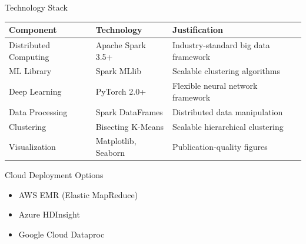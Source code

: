 \documentclass[10pt, aspectratio=169]{beamer}
\begin{document}
\begin{frame}{Technology Stack}
    \begin{table}
        \centering
        \footnotesize
        \begin{tabular}{@{}lll@{}}
            \toprule
            \textbf{Component} & \textbf{Technology} & \textbf{Justification} \\
            \midrule
            Distributed Computing & Apache Spark 3.5+ & Industry-standard big data framework \\
            ML Library & Spark MLlib & Scalable clustering algorithms \\
            Deep Learning & PyTorch 2.0+ & Flexible neural network framework \\
            Data Processing & Spark DataFrames & Distributed data manipulation \\
            Clustering & Bisecting K-Means & Scalable hierarchical clustering \\
            Visualization & Matplotlib, Seaborn & Publication-quality figures \\
            \bottomrule
        \end{tabular}
    \end{table}
    
    \vspace{0.5cm}
    
    \begin{block}{Cloud Deployment Options}
        \begin{itemize}
            \item AWS EMR (Elastic MapReduce)
            \item Azure HDInsight
            \item Google Cloud Dataproc
        \end{itemize}
    \end{block}
\end{frame}
\end{document}
